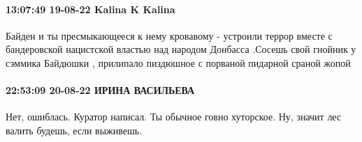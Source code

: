  
 
 
 
 

\paragraph{13:07:49 19-08-22 Kalina K Kalina}

Байден и ты пресмыкающееся к нему кровавому - устроили террор вместе с
бандеровской нацистской властью над народом Донбасса .Сосешь свой гнойник у
сэммика Байдюшки , прилипало пиздюшное с порваной пидарной сраной жопой

\paragraph{22:53:09 20-08-22 ИРИНА ВАСИЛЬЕВА}

Нет, ошиблась. Куратор написал. Ты обычное говно хуторское. Ну, значит лес
валить будешь, если выживешь.
